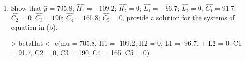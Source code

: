 \documentclass[12pt,a4paper]{paper}
\begin{document}
\begin{enumerate}
\begin{enumerate}
\[\begin{array}{cccccccccc}
  1 & 0 & 1 & 1 & 0 & 0 & 0 & 0 & 1 & 0 \\ 
  2 & 0 & 2 & 1 & 1 & 0 & 0 & 0 & 0 & 2 \\ 
\end{array}\right]
\left[\begin{array}{c}\mu\\H_{1}\\H_{2}\\L_{1}\\L_{2}\\C_{1}\\C_{2}\\C_{3}\\C_{4}\\C_{5}\end{array}\right] = \left[\begin{array}{cccccccccc}
1 & 1 & 0 & 1 & 0 & 1 & 0 & 0 & 0 & 0 \\ 
  1 & 1 & 0 & 0 & 1 & 1 & 0 & 0 & 0 & 0 \\ 
  1 & 1 & 0 & 1 & 0 & 0 & 1 & 0 & 0 & 0 \\ 
  1 & 0 & 1 & 1 & 0 & 0 & 0 & 1 & 0 & 0 \\ 
  1 & 0 & 1 & 0 & 1 & 0 & 0 & 1 & 0 & 0 \\ 
  1 & 0 & 1 & 1 & 0 & 0 & 0 & 0 & 1 & 0 \\ 
  1 & 0 & 1 & 1 & 0 & 0 & 0 & 0 & 0 & 1 \\ 
  1 & 0 & 1 & 0 & 1 & 0 & 0 & 0 & 0 & 1 \\ 
  \end{array}\right]\left[\begin{array}{c}600 \\ 
  680 \\ 
  500 \\ 
  800 \\ 
  895 \\ 
  775 \\ 
  600 \\ 
  715 \\ \end{array}\right]
\]
\item Show that $\hat{\mu} = 705.8$; $\hat{H_{1}} = -109.2$; $\hat{H_{2}} = 0$; $\hat{L_{1}} = -96.7$; $\hat{L_{2}} = 0$; $\hat{C_{1}} = 91.7$; $\hat{C_{2}} = 0$; $\hat{C_{3}} = 190$; $\hat{C_{4}} = 165.8$; $\hat{C_{5}} = 0$, provide a solution for the systems of equation in (b).
\begin{Schunk}
\begin{Sinput}
> betaHat <- c(mu = 705.8, H1 = -109.2, H2 = 0, L1 = -96.7,
+              L2 = 0, C1 = 91.7, C2 = 0, C3 = 190, C4 = 165, C5 = 0)

\end{Sinput}
\end{Schunk}
\end{enumerate}
\end{enumerate}
\end{document}

